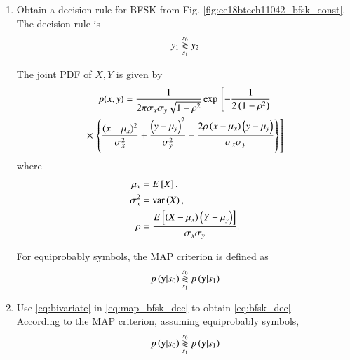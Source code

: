 \documentclass[journal,12pt,twocolumn]{IEEEtran}
\renewcommand\thesection{\arabic{section}}
\begin{document}
\begin{enumerate}[label=\thesection.\arabic*.,ref=\thesection.\theenumi]
\item
Obtain a decision rule for BFSK from Fig. \ref{fig:ee18btech11042_bfsk_const}.
\solution The decision rule is
\begin{equation}
\label{eq:bfsk_dec}
y_1 \overset{s_0}{\underset{s_1}{\gtrless}} y_2
\end{equation}
\begin{definition}
The joint PDF of $X,Y$ is given by
{\small
\begin{multline}
\label{eq:bivariate}
p(x,y)= \frac{1}{2\pi \sigma_x\sigma_y\sqrt{1-\rho^2}}\exp{}\left[-\frac{1}{2\left(1-\rho^2\right)}\right.
\\
\times {}\left.\left\{\frac{\left(x-\mu_x\right)^2}{\sigma_x^2}+\frac{\left(y-\mu_y\right)^2}{\sigma_y^2}-\frac{2\rho\left(x-\mu_x\right)\left(y-\mu_y\right)}{\sigma_x\sigma_y}\right\}\right]
\end{multline}
}
%
where
\begin{align}
\mu_x &= E{}\left[X\right],
\\
\sigma_x^2 &= \text{var}\left(X\right),
\\
\rho &= \frac{E{}\left[\left(X - \mu_x\right)\left(Y-\mu_y\right)\right]}{\sigma_x\sigma_y}.
\end{align}
%
\end{definition}
%

For equiprobably symbols, the MAP criterion is defined as
%
\begin{equation}
\label{eq:map_bfsk_dec}
p\left(\mathbf{y}|s_0\right) \overset{s_0}{\underset{s_1}{\gtrless}} p\left(\mathbf{y}|s_1\right)
\end{equation}
\item
Use \eqref{eq:bivariate} in \eqref{eq:map_bfsk_dec}  to obtain \eqref{eq:bfsk_dec}.
\\
\solution According to the MAP criterion, assuming equiprobably symbols,
\begin{align}
p\left(\mathbf{y}|s_0\right) \overset{s_0}{\underset{s_1}{\gtrless}} p\left(\mathbf{y}|s_1\right)
\end{align}


\end{enumerate}
\end{document}
